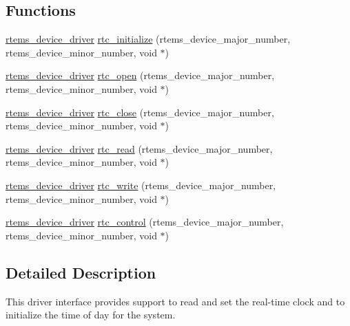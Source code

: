 \subsection*{Functions}
\begin{DoxyCompactItemize}
\item 
\mbox{\hyperlink{group__ClassicStatus_ga545d41846817eaba6143d52ee4d9e9fe}{rtems\+\_\+device\+\_\+driver}} \mbox{\hyperlink{group__rtems__rtc_ga2ae314f2070b5f983cab0a77c5ee0126}{rtc\+\_\+initialize}} (rtems\+\_\+device\+\_\+major\+\_\+number, rtems\+\_\+device\+\_\+minor\+\_\+number, void $\ast$)
\item 
\mbox{\hyperlink{group__ClassicStatus_ga545d41846817eaba6143d52ee4d9e9fe}{rtems\+\_\+device\+\_\+driver}} \mbox{\hyperlink{group__rtems__rtc_gae84793d63a851c576863c2666b158836}{rtc\+\_\+open}} (rtems\+\_\+device\+\_\+major\+\_\+number, rtems\+\_\+device\+\_\+minor\+\_\+number, void $\ast$)
\item 
\mbox{\hyperlink{group__ClassicStatus_ga545d41846817eaba6143d52ee4d9e9fe}{rtems\+\_\+device\+\_\+driver}} \mbox{\hyperlink{group__rtems__rtc_gad08359e1011ccbf1901dbbe8444a0dc9}{rtc\+\_\+close}} (rtems\+\_\+device\+\_\+major\+\_\+number, rtems\+\_\+device\+\_\+minor\+\_\+number, void $\ast$)
\item 
\mbox{\hyperlink{group__ClassicStatus_ga545d41846817eaba6143d52ee4d9e9fe}{rtems\+\_\+device\+\_\+driver}} \mbox{\hyperlink{group__rtems__rtc_ga7228612815843b7f28591a82a5812f2e}{rtc\+\_\+read}} (rtems\+\_\+device\+\_\+major\+\_\+number, rtems\+\_\+device\+\_\+minor\+\_\+number, void $\ast$)
\item 
\mbox{\hyperlink{group__ClassicStatus_ga545d41846817eaba6143d52ee4d9e9fe}{rtems\+\_\+device\+\_\+driver}} \mbox{\hyperlink{group__rtems__rtc_ga24c0df997c95c6aa01cac46dd6fe4913}{rtc\+\_\+write}} (rtems\+\_\+device\+\_\+major\+\_\+number, rtems\+\_\+device\+\_\+minor\+\_\+number, void $\ast$)
\item 
\mbox{\hyperlink{group__ClassicStatus_ga545d41846817eaba6143d52ee4d9e9fe}{rtems\+\_\+device\+\_\+driver}} \mbox{\hyperlink{group__rtems__rtc_ga0bfcc2d4bb0e86104e8b6055d1614fef}{rtc\+\_\+control}} (rtems\+\_\+device\+\_\+major\+\_\+number, rtems\+\_\+device\+\_\+minor\+\_\+number, void $\ast$)
\end{DoxyCompactItemize}


\subsection{Detailed Description}
This driver interface provides support to read and set the real-\/time clock and to initialize the time of day for the system. 

